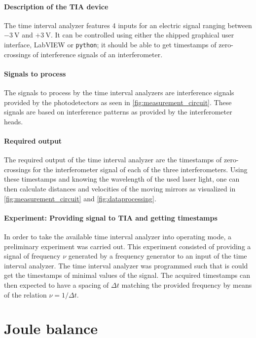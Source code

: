 \documentclass{report}
\numberwithin{tm}{section}
\begin{document}
\subsubsection{Description of the TIA device}
The time interval analyzer features 4 inputs for an electric signal ranging between $-\SI{3}{\volt}$ and $+\SI{3}{\volt}$. It can be controlled using either the shipped graphical user interface, LabVIEW or \verb|python|; it should be able to get timestamps of zero-crossings of interference signals of an interferometer.

\subsubsection{Signals to process}
The signals to process by the time interval analyzers are interference signals provided by the photodetectors as seen in \cref{fig:measurement_circuit}. These signals are based on interference patterns as provided by the interferometer heads.

\subsubsection{Required output}
The required output of the time interval analyzer are the timestamps of zero-crossings for the interferometer signal of each of the three interferometers. Using these timestamps and knowing the wavelength of the used laser light, one can then calculate distances and velocities of the moving mirrors as visualized in \cref{fig:measurement_circuit} and \cref{fig:dataprocessing}.

\subsubsection{Experiment: Providing signal to TIA and getting timestamps}
In order to take the available time interval analyzer into operating mode, a preliminary experiment was carried out. This experiment consisted of providing a signal of frequency $\nu$ generated by a frequency generator to an input of the time interval analyzer. The time interval analyzer was programmed such that is could get the timestamps of minimal values of the signal. The acquired timestamps can then expected to have a spacing of $\Delta t$ matching the provided frequency by means of the relation $\nu = 1/\Delta t$.

\chapter{Joule balance}
\end{document}

